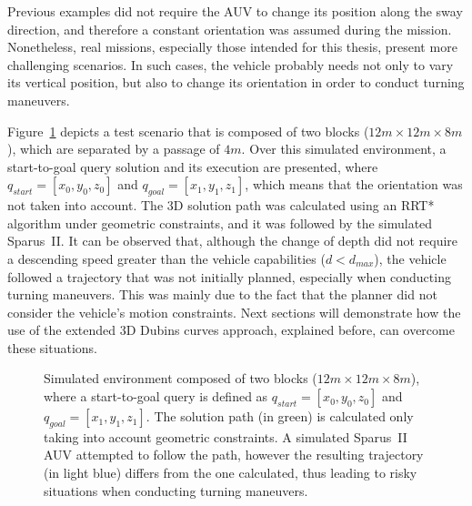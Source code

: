 Previous examples did not require the \ac{AUV} to change its position along the
sway direction, and therefore a constant orientation was assumed during the
mission. Nonetheless, real missions, especially those intended for this thesis,
present more challenging scenarios. In such cases, the vehicle probably needs
not only to vary its vertical position, but also to change its orientation in
order to conduct turning maneuvers.

Figure~\ref{fig:S2PlannOffBlocksRRTstarGeom3D} depicts a test scenario that is
composed of two blocks ($12m \times 12m \times 8m$), which are separated by a
passage of $4m$. Over this simulated environment, a start-to-goal query solution and its
execution are presented, where $q_{start} = [x_0, y_0, z_0]$ and $q_{goal} =
[x_1, y_1, z_1]$, which means that the orientation was not taken into account.
The \ac{3D} solution path was calculated using an \ac{RRT*} algorithm under
geometric constraints, and it was followed by the simulated Sparus~II. It can be
observed that, although the change of depth did not require a descending speed
greater than the vehicle capabilities (\ie $d<d_{max}$), the vehicle followed a
trajectory that was not initially planned, especially when conducting turning
maneuvers. This was mainly due to the fact that the planner did not consider the
vehicle's motion constraints. Next sections will demonstrate how the use of the
extended \ac{3D} Dubins curves approach, explained before, can overcome these
situations.

\begin{figure}[htbp]
    \myfloatalign
     \quad
     \quad
\caption[Simulation of the Sparus~II AUV attempting to follow a 3D solution path
calculated by an RRT* under geometric constraints.]
{Simulated environment composed of two blocks ($12m \times 12m \times 8m$),
where a start-to-goal query is defined as $q_{start} = [x_0, y_0, z_0]$ and $q_{goal} =
[x_1, y_1, z_1]$. The solution path (in green) is calculated only taking into
account geometric constraints. A simulated Sparus~II AUV attempted to follow the
path, however the resulting trajectory (in light blue) differs from the one
calculated, thus leading to risky situations when conducting turning maneuvers.}
\label{fig:S2PlannOffBlocksRRTstarGeom3D}
\end{figure}


